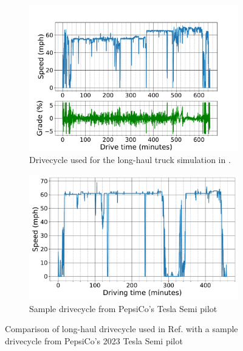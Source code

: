 \begin{figure}[H]
    \centering
    \begin{subfigure}[b]{0.49\textwidth}
        \centering
        \includegraphics[width=\textwidth]{figures/long_haul_drivecycle.pdf}
        \caption{Drivecycle used for the long-haul truck simulation in \cite{Sader_2023}.}
        \label{fig:long_haul_drivecycle}
    \end{subfigure}
    \hfill
    \begin{subfigure}[b]{0.49\textwidth}
        \centering
        \includegraphics[width=\textwidth]{figures/pepsi_3_drive_cycle_24_paper.pdf}
        \caption{Sample drivecycle from PepsiCo's Tesla Semi pilot}
        \label{fig:sample_pepsico_drivecycle}
    \end{subfigure}
    \caption{Comparison of long-haul drivecycle used in Ref. \cite{Sader_2023} with a sample drivecycle from PepsiCo's 2023 Tesla Semi pilot}
    \label{fig:drivecycles}
\end{figure}

